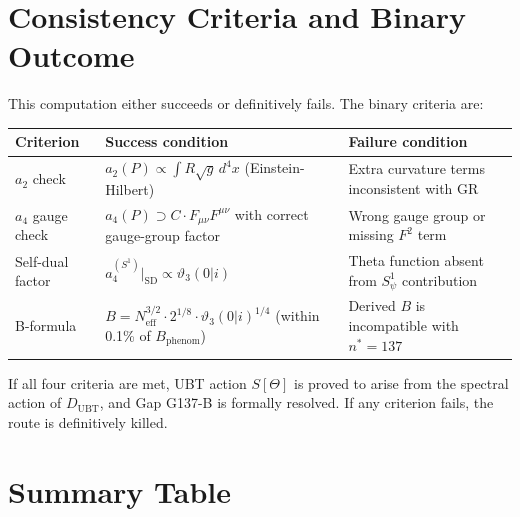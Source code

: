 \documentclass[12pt,a4paper]{article}
\theoremstyle{definition}
\theoremstyle{remark}
\begin{document}
\section{Consistency Criteria and Binary Outcome}
\label{sec:criteria}

This computation either succeeds or definitively fails.
The binary criteria are:

\begin{center}
\begin{tabular}{p{3cm} p{5cm} p{4.5cm}}
\toprule
\textbf{Criterion} & \textbf{Success condition} & \textbf{Failure condition} \\
\midrule
$a_2$ check & $a_2(P) \propto \int R\sqrt{g}\,d^4x$ (Einstein-Hilbert) &
  Extra curvature terms inconsistent with GR \\[4pt]
$a_4$ gauge check & $a_4(P) \supset C\cdot F_{\mu\nu}F^{\mu\nu}$
  with correct gauge-group factor &
  Wrong gauge group or missing $F^2$ term \\[4pt]
Self-dual factor & $a_4^{(S^1)}|_{\mathrm{SD}} \propto \vartheta_3(0|i)$ &
  Theta function absent from $S^1_\psi$ contribution \\[4pt]
B-formula & $B = N_{\mathrm{eff}}^{3/2}\cdot 2^{1/8}\cdot\vartheta_3(0|i)^{1/4}$
  (within 0.1\% of $B_{\mathrm{phenom}}$) &
  Derived $B$ is incompatible with $n^*=137$ \\[4pt]
\bottomrule
\end{tabular}
\end{center}

If all four criteria are met, UBT action $S[\Theta]$ is proved to arise from
the spectral action of $D_{\mathrm{UBT}}$, and Gap G137-B is formally resolved.
If any criterion fails, the route is definitively killed.

\section{Summary Table}
\label{sec:summary}
\end{document}
